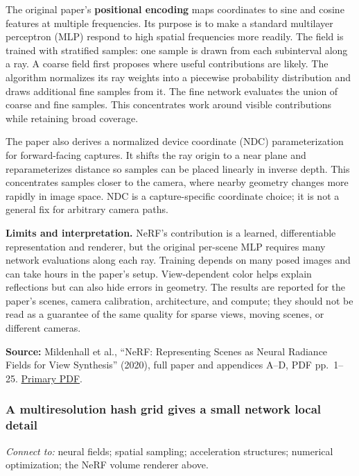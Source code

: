 The original paper's \textbf{positional encoding} maps coordinates to sine and cosine features at multiple frequencies. Its purpose is to make a standard multilayer perceptron (MLP) respond to high spatial frequencies more readily. The field is trained with stratified samples: one sample is drawn from each subinterval along a ray. A coarse field first proposes where useful contributions are likely. The algorithm normalizes its ray weights into a piecewise probability distribution and draws additional fine samples from it. The fine network evaluates the union of coarse and fine samples. This concentrates work around visible contributions while retaining broad coverage.

The paper also derives a normalized device coordinate (NDC) parameterization for forward-facing captures. It shifts the ray origin to a near plane and reparameterizes distance so samples can be placed linearly in inverse depth. This concentrates samples closer to the camera, where nearby geometry changes more rapidly in image space. NDC is a capture-specific coordinate choice; it is not a general fix for arbitrary camera paths.

\textbf{Limits and interpretation.} NeRF's contribution is a learned, differentiable representation and renderer, but the original per-scene MLP requires many network evaluations along each ray. Training depends on many posed images and can take hours in the paper's setup. View-dependent color helps explain reflections but can also hide errors in geometry. The results are reported for the paper's scenes, camera calibration, architecture, and compute; they should not be read as a guarantee of the same quality for sparse views, moving scenes, or different cameras.

\textbf{Source:} Mildenhall et al., ``NeRF: Representing Scenes as Neural Radiance Fields for View Synthesis'' (2020), full paper and appendices A--D, PDF pp.~1--25. \href{https://arxiv.org/pdf/2003.08934}{Primary PDF}.

\subsubsection{A multiresolution hash grid gives a small network local detail}\label{04-visual-computing-ii-ch034-a-multiresolution-hash-grid-gives-a-small-network-local-detail}

\hypertarget{04-visual-computing-ii-ch034-a-multiresolution-hash-grid-gives-a-small-network-local-detail}{}

\emph{Connect to:} neural fields; spatial sampling; acceleration structures; numerical optimization; the NeRF volume renderer above.


